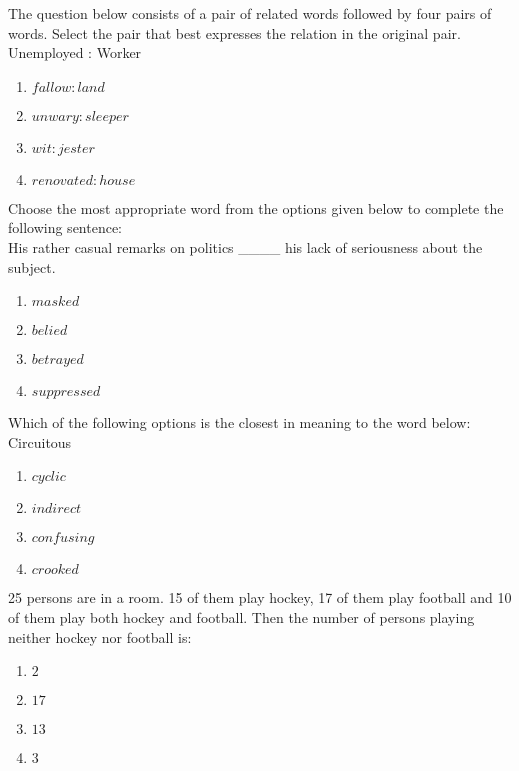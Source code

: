 
\iffalse
\chapter{2010}
\author{EE24BTECH11004}
\section{xe}
\fi

\item The question below consists of a pair of related words followed by four pairs of words. Select the pair that best expresses the relation in the original pair. \\
    {Unemployed : Worker}
    \begin{enumerate}
        \item $  fallow : land $
        \item $  unwary : sleeper $
        \item $  wit : jester $
        \item $  renovated : house $
    \end{enumerate}

    \item Choose the most appropriate word from the options given below to complete the following sentence: \\
    {His rather casual remarks on politics \_\_\_\_ his lack of seriousness about the subject.}
    \begin{enumerate}
        \item $  {masked} $
        \item $  {belied} $
        \item $  {betrayed} $
        \item $  {suppressed} $
    \end{enumerate}

\item Which of the following options is the closest in meaning to the word below: \\
    {Circuitous}
    \begin{enumerate}
        \item $  {cyclic} $
        \item $  {indirect} $
        \item $  {confusing} $
        \item $  {crooked} $
    \end{enumerate}

\item 25 persons are in a room. 15 of them play hockey, 17 of them play football and 10 of them play both hockey and football. Then the number of persons playing neither hockey nor football is:
    \begin{enumerate}
        \item $  2 $
        \item $  17 $
        \item $  13 $
        \item $  3 $
    \end{enumerate}


